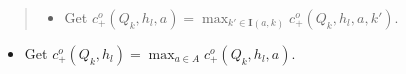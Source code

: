 \documentclass[a4paper,10pt,english]{sphinxmanual}
\begin{document}
{\begin{minipage}{0.95\linewidth}
\begin{quote}
\begin{itemize}
\begin{quote}
\begin{itemize}
\begin{quote}
\begin{itemize}
\item {} 
Get current payoff profile \(v(a,b)\)

\item {} 
Solve conditional LP:

\end{itemize}
\begin{gather}
\begin{split} c_{+}^{o}(Q_k,h_l,a,k',\lambda,b) &
 = \max_{w} h_l [ (1-\delta)v(a,b) + \delta P w ]
 \\
 s.t. &
\\
 H w & \leq c^{o}(Q_{k'}, h_l)
 \\
 \delta[p^j(a')-p^j(a_j)]\cdot w & \leq (1-\delta) [\phi(a')-\phi(a_j)], \  \forall j \in \mathcal{Z}
 \\
 -\lambda \delta P w &
 \leq \lambda [ (1-\delta)v(a,b) ] - \check{\pi}(Q_{k})\end{split}\notag
\end{gather}\end{quote}

\item {} 
Get \(c_{+}^{o}(Q_k,h_l,a,k') = \max_{(\lambda,b) \in F(k';a,k)} c_{+}^{o}(Q_k,h_l,a, k',\lambda,b)\).

\end{itemize}
\end{quote}

\item {} 
Get \(c_{+}^{o}(Q_k,h_l,a) = \max_{k' \in \mathbf{I}(a,k)} c_{+}^{o}(Q_k,h_l,a,k')\).

\end{itemize}
\end{quote}
\begin{itemize}
\item {} 
Get \(c_{+}^{o}(Q_k,h_l) = \max_{a \in A} c_{+}^{o}(Q_k,h_l,a)\).

\end{itemize}
\end{minipage}}
\begin{center}\setlength{\fboxsep}{5pt}\end{center}

\begin{DUlineblock}{0em}
\item[] 
\item[] 
\end{DUlineblock}
\end{document}

